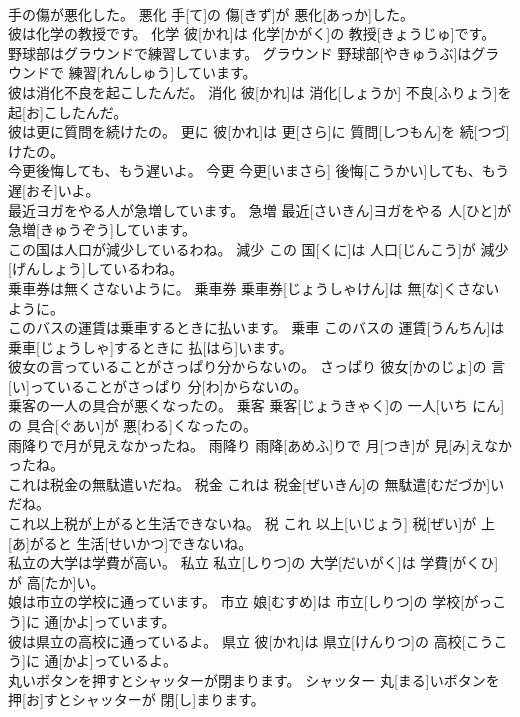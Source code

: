 \documentclass[8pt]{extreport}
\begin{document}
\begin{CJK}{UTF8}{min}
\\	手の傷が悪化した。	悪化	手[て]の 傷[きず]が 悪化[あっか]した。	
\\	彼は化学の教授です。	化学	彼[かれ]は 化学[かがく]の 教授[きょうじゅ]です。	
\\	野球部はグラウンドで練習しています。	グラウンド	野球部[やきゅうぶ]はグラウンドで 練習[れんしゅう]しています。	
\\	彼は消化不良を起こしたんだ。	消化	彼[かれ]は 消化[しょうか] 不良[ふりょう]を 起[お]こしたんだ。	
\\	彼は更に質問を続けたの。	更に	彼[かれ]は 更[さら]に 質問[しつもん]を 続[つづ]けたの。	
\\	今更後悔しても、もう遅いよ。	今更	今更[いまさら] 後悔[こうかい]しても、もう 遅[おそ]いよ。	
\\	最近ヨガをやる人が急増しています。	急増	最近[さいきん]ヨガをやる 人[ひと]が 急増[きゅうぞう]しています。	
\\	この国は人口が減少しているわね。	減少	この 国[くに]は 人口[じんこう]が 減少[げんしょう]しているわね。	
\\	乗車券は無くさないように。	乗車券	乗車券[じょうしゃけん]は 無[な]くさないように。	
\\	このバスの運賃は乗車するときに払います。	乗車	このバスの 運賃[うんちん]は 乗車[じょうしゃ]するときに 払[はら]います。	
\\	彼女の言っていることがさっぱり分からないの。	さっぱり	彼女[かのじょ]の 言[い]っていることがさっぱり 分[わ]からないの。	
\\	乗客の一人の具合が悪くなったの。	乗客	乗客[じょうきゃく]の 一人[いち にん]の 具合[ぐあい]が 悪[わる]くなったの。	
\\	雨降りで月が見えなかったね。	雨降り	雨降[あめふ]りで 月[つき]が 見[み]えなかったね。	
\\	これは税金の無駄遣いだね。	税金	これは 税金[ぜいきん]の 無駄遣[むだづか]いだね。	
\\	これ以上税が上がると生活できないね。	税	これ 以上[いじょう] 税[ぜい]が 上[あ]がると 生活[せいかつ]できないね。	
\\	私立の大学は学費が高い。	私立	私立[しりつ]の 大学[だいがく]は 学費[がくひ]が 高[たか]い。	
\\	娘は市立の学校に通っています。	市立	娘[むすめ]は 市立[しりつ]の 学校[がっこう]に 通[かよ]っています。	
\\	彼は県立の高校に通っているよ。	県立	彼[かれ]は 県立[けんりつ]の 高校[こうこう]に 通[かよ]っているよ。	
\\	丸いボタンを押すとシャッターが閉まります。	シャッター	丸[まる]いボタンを 押[お]すとシャッターが 閉[し]まります。	

\end{CJK}
\end{document}
